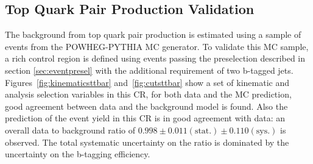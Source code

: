 \subsection{Top Quark Pair Production Validation}
\label{sec:top_est}

The background from top quark pair production is estimated using a sample of events from the POWHEG-PYTHIA MC
generator. To validate this MC sample,  a \ttbar rich control region is defined using events passing 
the preselection described in section \ref{sec:eventpresel} with the additional requirement of two b-tagged jets.
Figures~\ref{fig:kinematicsttbar} and~\ref{fig:cutsttbar} show a set of kinematic and analysis selection
variables in this CR, for both data and the MC prediction,  good agreement between data and the background model is found.
Also the prediction of the event yield in this CR is in good agreement with data: an overall
data to background ratio of $0.998 \pm 0.011\mathrm{(stat.)} \pm 0.110 \mathrm{(sys.)}$ is observed. 
The total systematic uncertainty on the ratio is dominated by the uncertainty on the b-tagging efficiency. 
%


